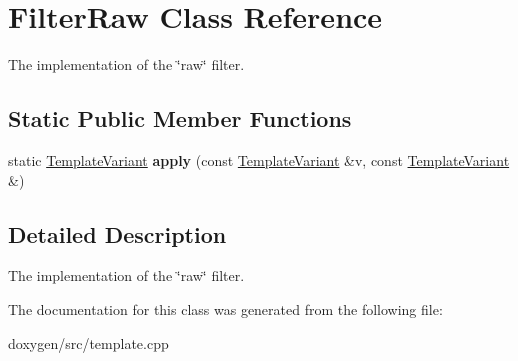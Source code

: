 \hypertarget{class_filter_raw}{}\section{Filter\+Raw Class Reference}
\label{class_filter_raw}


The implementation of the \char`\"{}raw\char`\"{} filter.  


\subsection*{Static Public Member Functions}
\begin{DoxyCompactItemize}
\item 
\mbox{\label{class_filter_raw_a2289d87ff8564970a5166d4e4938f226}} 
static \mbox{\hyperlink{class_template_variant}{Template\+Variant}} {\bfseries apply} (const \mbox{\hyperlink{class_template_variant}{Template\+Variant}} \&v, const \mbox{\hyperlink{class_template_variant}{Template\+Variant}} \&)
\end{DoxyCompactItemize}


\subsection{Detailed Description}
The implementation of the \char`\"{}raw\char`\"{} filter. 

The documentation for this class was generated from the following file\+:\begin{DoxyCompactItemize}
\item 
doxygen/src/template.\+cpp\end{DoxyCompactItemize}
